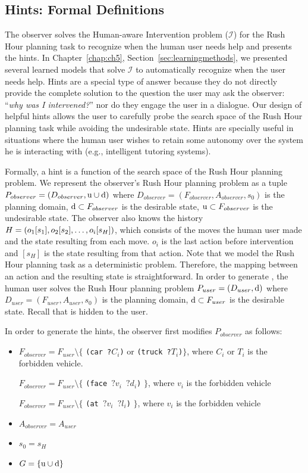 \subsection{Hints: Formal Definitions}
The observer solves the Human-aware Intervention problem ($\mathcal{I}$) for the Rush Hour planning task to recognize when the human user needs help and presents the hints.
In Chapter~\ref{chap:ch5}, Section~\ref{sec:learningmethods}, we presented several learned models that solve $\mathcal{I}$ to automatically recognize when the user needs help.
Hints are a special type of answer because they do not directly provide the complete solution to the question the user may ask the observer: ``\textit{why was I intervened?}'' nor do they engage the user in a dialogue. 
Our design of helpful hints allows the user to carefully probe the search space of the Rush Hour planning task while avoiding the undesirable state. 
Hints are specially useful in situations where the human user wishes to retain some autonomy over the system he is interacting with (e.g., intelligent tutoring systems).

\sloppy
Formally, a hint is a function of the search space of the Rush Hour planning problem. 
We represent the observer's Rush Hour planning problem as a tuple $P_{observer}=(D_{observer}, \mathrm{u}\cup\mathrm{d})$ where $D_{observer}=(F_{observer}, A_{observer}, s_0)$ is the planning domain, $\mathrm{d} \subset F_{observer}$ is the desirable state, $\mathrm{u} \subset F_{observer}$ is the undesirable state.
The observer also knows the history $H=(o_1[s_1], o_2[s_2], \ldots, o_{i}[s_H])$, which consists of the moves the human user made and the state resulting from each move.
$o_i$ is the last action before intervention and $[s_H]$ is the state resulting from that action.
Note that we model the Rush Hour planning task as a deterministic problem. 
Therefore, the mapping between an action and the resulting state is straightforward.
In order to generate \historyDef, the human user solves the Rush Hour planning problem $P_{user} = (D_{user}, \mathrm{d})$ where $D_{user}=(F_{user}, A_{user}, s_0)$ is the planning domain, $\mathrm{d} \subset F_{user}$ is the desirable state. 
Recall that \undesired is hidden to the user.

In order to generate the hints, the observer first modifies $P_{observer}$ as follows:
\begin{itemize}
\item $F_{observer} = F_{user} \setminus \lbrace$ \texttt{(car ?$C_i$)} or \texttt{(truck ?$T_i$)}$\rbrace$, where $C_i$ or $T_i$ is the forbidden vehicle.

$F_{observer} = F_{user} \setminus \lbrace$ \texttt{(face $?v_i$ $?d_i$)} $\rbrace$, where $v_i$ is the forbidden vehicle

$F_{observer} = F_{user} \setminus \lbrace$ \texttt{(at $?v_i$ $?l_i$)} $\rbrace$, where $v_i$ is the forbidden vehicle

\item $A_{observer} = A_{user}$
\item $s_0 = s_H$
\item $G= \lbrace \mathrm{u}\cup\mathrm{d} \rbrace$
\end{itemize}

